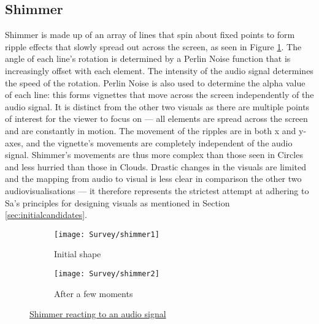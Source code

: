 \documentclass[../initial_thesis.tex]{subfiles}
\begin{document}
\subsection{Shimmer}
Shimmer is made up of an array of lines that spin about fixed points to form ripple effects that slowly spread out across the screen, as seen in Figure \ref{fig:shimmer1}. The angle of each line's rotation is determined by a Perlin Noise function that is increasingly offset with each element. The intensity of the audio signal determines the speed of the rotation. Perlin Noise is also used to determine the alpha value of each line: this forms vignettes that move across the screen independently of the audio signal. It is distinct from the other two visuals as there are multiple points of interest for the viewer to focus on --- all elements are spread across the screen and are constantly in motion. The movement of the ripples are in both x and y-axes, and the vignette's movements are completely independent of the audio signal. Shimmer's movements are thus more complex than those seen in Circles and less hurried than those in Clouds. Drastic changes in the visuals are limited and the mapping from audio to visual is less clear in comparison the other two audiovisualisations --- it therefore represents the strictest attempt at adhering to Sa's principles for designing visuals as mentioned in Section \ref{sec:initialcandidates}. 

\begin{figure}
  \begin{subfigure}{0.5\textwidth}
    \texttt{[image: Survey/shimmer1]}
    \caption{Initial shape}
  \end{subfigure} 
  \begin{subfigure}{0.5\textwidth}
    \texttt{[image: Survey/shimmer2]}
    \caption{After a few moments}
  \end{subfigure}
  \caption{\href{https://vimeo.com/327859350}{Shimmer reacting to an audio signal}}
  \label{fig:shimmer1}
\end{figure}
\end{document}
